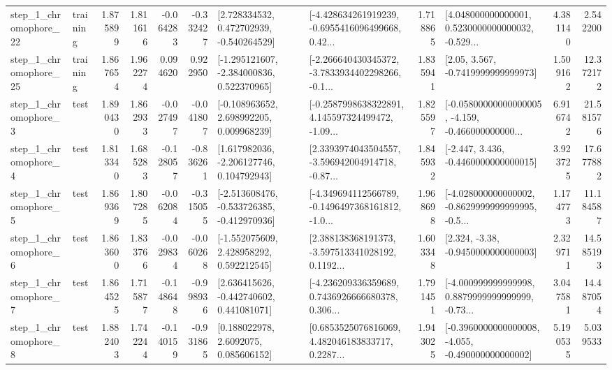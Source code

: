 \begin{tabular}{llrrrrllrlrr}
    step\_1\_chromophore\_22 &  training &      1.875899 &    1.811616 &     -0.064283 & -0.332427 &    [2.728334532, 0.472702939, -0.540264529] &  [-4.428634261919239, -0.6955416096499668, 0.42... &       1.718865 &  [4.048000000000001, 0.5230000000000032, -0.529... &            4.381140 &          2.542200 \\
    step\_1\_chromophore\_25 &  training &      1.867654 &    1.962274 &      0.094620 &  0.922950 &   [-1.295121607, -2.384000836, 0.522370965] &  [-2.266640430345372, -3.7833934402298266, -0.1... &       1.835941 &                 [2.05, 3.567, -0.7419999999999973] &            1.509162 &         12.372172 \\
     step\_1\_chromophore\_3 &      test &      1.890430 &    1.862933 &     -0.027497 & -0.041807 &    [-0.108963652, 2.698992205, 0.009968239] &  [-0.2587998638322891, 4.145597324499472, -1.09... &       1.825597 &  [-0.05800000000000005, -4.159, -0.466000000000... &            6.916742 &         21.581576 \\
     step\_1\_chromophore\_4 &      test &      1.813340 &    1.685283 &     -0.128057 & -0.836261 &    [1.617982036, -2.206127746, 0.104792943] &  [2.3393974043504557, -3.596942004914718, -0.87... &       1.845932 &               [-2.447, 3.436, -0.4460000000000015] &            3.923725 &         17.677882 \\
     step\_1\_chromophore\_5 &      test &      1.869369 &    1.807285 &     -0.062084 & -0.315055 &  [-2.513608476, -0.533726385, -0.412970936] &  [-4.349694112566789, -0.1496497368161812, -1.0... &       1.968698 &  [-4.028000000000002, -0.8629999999999995, -0.5... &            1.174773 &         11.184587 \\
     step\_1\_chromophore\_6 &      test &      1.863600 &    1.833766 &     -0.029834 & -0.060268 &    [-1.552075609, 2.428958292, 0.592212545] &  [2.388138368191373, -3.597513341028192, 0.1192... &       1.603348 &                [2.324, -3.38, -0.9450000000000003] &            2.329711 &         14.585193 \\
     step\_1\_chromophore\_7 &      test &      1.864525 &    1.715877 &     -0.148648 & -0.998936 &    [2.636415626, -0.442740602, 0.441081071] &  [-4.236209336359689, 0.7436926666680378, 0.306... &       1.791451 &  [-4.000999999999998, 0.8879999999999999, -0.73... &            3.047581 &         14.487054 \\
     step\_1\_chromophore\_8 &      test &      1.882403 &    1.742244 &     -0.140159 & -0.931865 &       [0.188022978, 2.6092075, 0.085606152] &  [0.6853525076816069, 4.482046183833717, 0.2287... &       1.943025 &  [-0.3960000000000008, -4.055, -0.490000000000002] &            5.190535 &          5.039533 \\

\end{tabular}
